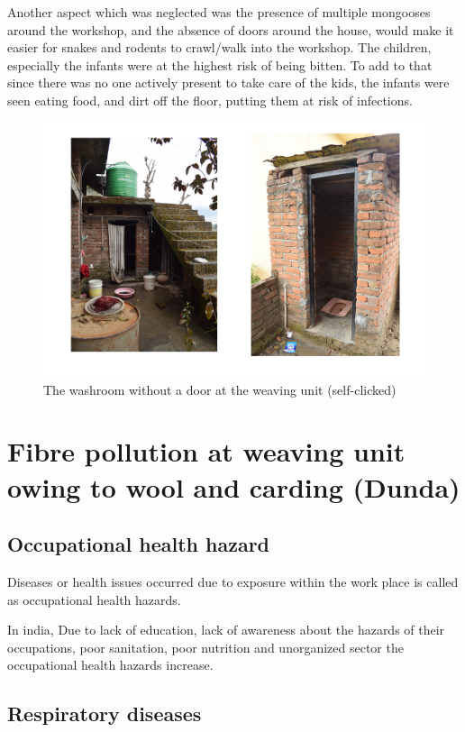 \documentclass[journal]{IEEEtran}
\begin{document}
Another aspect which was neglected was the presence of multiple mongooses around the workshop, and the absence of doors around the house, would make it easier for snakes and rodents to crawl/walk into the workshop. The children, especially the infants were at the highest risk of being bitten. To add to that since there was no one actively present to take care of the kids, the infants were seen eating food, and dirt off the floor, putting them at risk of infections. 

\begin{figure}
  \includegraphics[width=\linewidth]{toilet.jpg}
  \caption{The washroom without a door at the weaving unit (self-clicked)}
  \label{Family Tree Pashmina Cluster}
\end{figure}

\section{Fibre pollution at weaving unit owing to wool and carding (Dunda)
} 

\subsection{Occupational health hazard}
Diseases or health issues occurred due to exposure within the work place is called as occupational health hazards. 

In india, Due to lack of education, lack of awareness about the hazards of their occupations, poor  sanitation, poor nutrition and unorganized sector the occupational health hazards increase.


\subsection{Respiratory diseases}
\end{document}
